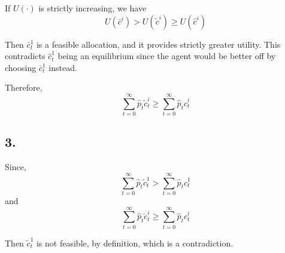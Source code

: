 \documentclass[12pt]{article}
\theoremstyle{definition}
\begin{document}
If $U(\cdot)$ is strictly increasing, we have
\[
U(\bar{c}^i)>U(\tilde{c}^i)\geq U(\hat{c}^i) 
\]

Then $\bar{c}_t^1$ is a feasible allocation, and it provides strictly greater utility. This contradicts $\hat{c}_t^1$ being an equilibrium since the agent would be better off by choosing $\bar{c}_t^1$ instead.

Therefore,
\[
\sum_{t=0}^{\infty} \hat{p}_t \tilde{c}_t^i \geq \sum_{t=0}^{\infty} \hat{p}_t \hat{c}_t^i
\]
\subsection*{3.}

Since,
\[
\sum_{t=0}^{\infty} \hat{p}_t \tilde{c}_t^1 > \sum_{t=0}^{\infty} \hat{p}_t \hat{c}_t^1
\]
and
\[
\sum_{t=0}^{\infty} \hat{p}_t \tilde{c}_t^i \geq \sum_{t=0}^{\infty} \hat{p}_t \hat{c}_t^i
\]

Then $\tilde{c}_t^1$ is not feasible, by definition, which is a contradiction.
\end{document}
